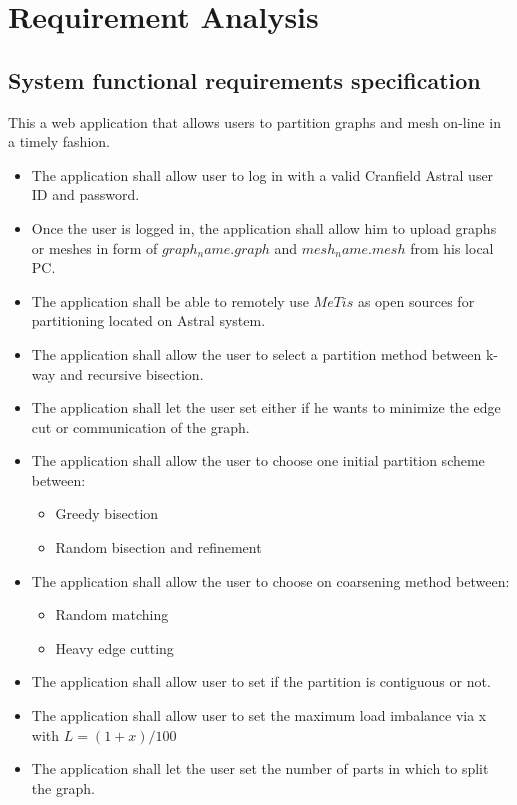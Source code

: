 \documentclass{cranfieldChart}
\begin{document}
\section{Requirement Analysis}
\subsection{System functional requirements specification}
This a web application that allows users to partition graphs and mesh on-line in a timely fashion. 
\begin{itemize}
    \item The application shall allow user to log in with a valid Cranfield Astral user ID and password. 
    \item Once the user is logged in, the application shall allow him to upload graphs or meshes in form of $graph_name.graph$ and $mesh_name.mesh$ from his local PC. 
    \item The application shall be able to remotely use $MeTis$ as open sources for partitioning located on Astral system. 
    \item The application shall allow the user to select a partition method between k-way and recursive bisection.
     \item The application shall let the user set either if he wants to minimize the edge cut or communication of the graph.
    \item The application shall allow the user to choose one initial partition scheme between:
        \begin{itemize}
             \item Greedy bisection
            \item Random bisection and refinement 
        \end{itemize}
    \item The application shall allow the user to choose on coarsening method between: 
        \begin{itemize}
            \item Random matching 
            \item Heavy edge cutting 
        \end{itemize}
    \item The application shall allow user to set if the partition is contiguous or not. 
    \item The application shall allow user to set the maximum load imbalance via x with $L= (1+x)/100$
    \item The application shall let the user set the number of parts in which to split the graph. 

\end{itemize}
\end{document}
